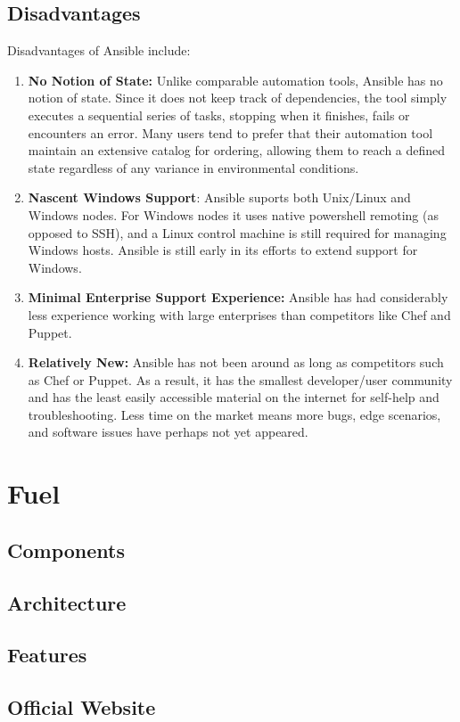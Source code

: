 \documentclass[a4paper, 12pt]{article}
\begin{document}
\subsection{Disadvantages}
Disadvantages of Ansible include:
\begin{enumerate}
\item
\textbf{No Notion of State:} Unlike comparable automation tools, Ansible has no notion of state. Since it does not keep track of dependencies, the tool simply executes a sequential series of tasks, stopping when it finishes, fails or encounters an error. Many users tend to prefer that their automation tool maintain an extensive catalog for ordering, allowing them to reach a defined state regardless of any variance in environmental conditions.
\item
\textbf{Nascent Windows Support}: Ansible suports both Unix/Linux and Windows nodes. For Windows nodes it uses native powershell remoting (as opposed to SSH), and a Linux control machine is still required for managing Windows hosts. Ansible is still early in its efforts to extend support for Windows. 
\item
\textbf{Minimal Enterprise Support Experience:} Ansible has had considerably less experience working with large enterprises than competitors like Chef and Puppet. 
\item
\textbf{Relatively New:} Ansible has not been around as long as competitors such as Chef or Puppet. As a result, it has the smallest developer/user community and has the least easily accessible material on the internet for self-help and troubleshooting. Less time on the market means more bugs, edge scenarios, and software issues have perhaps not yet appeared. 
\end{enumerate}


\newpage
\section{Fuel}
\subsection{Components}
\subsection{Architecture}
\subsection{Features}
\subsection{Official Website}
\end{document}
